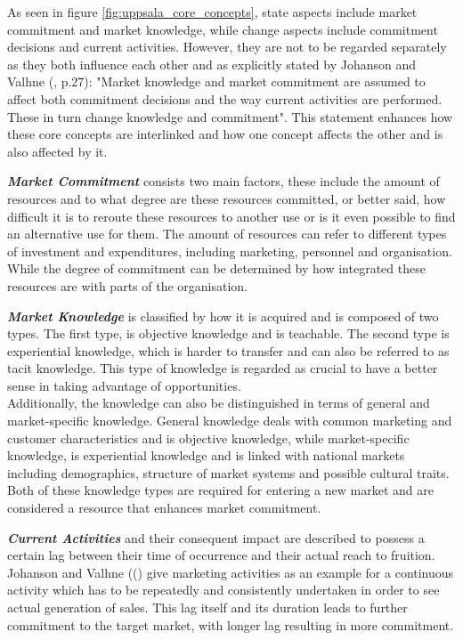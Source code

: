\documentclass[12pt,a4paper]{article}
\begin{document}
 
As seen in figure \ref{fig:uppsala_core_concepts}, state aspects include market commitment and market knowledge, while change aspects include commitment decisions and current activities. However, they are not to be regarded separately as they both influence each other and as explicitly stated by Johanson and Valhne (\citeyear{johansonInternationalizationProcessFirm1977}, p.27): "Market knowledge and market commitment are assumed to affect both commitment decisions and
the way current activities are performed. These in turn change knowledge and commitment". This statement enhances how these core concepts are interlinked and how one concept affects the other and is also affected by it.  \par
\textbf{\textit{Market Commitment}} consists two main factors, these include the amount of resources and to what degree are these resources committed, or better said, how difficult it is to reroute these resources to another use or is it even possible to find an alternative use for them. The amount of resources can refer to different types of investment and expenditures, including marketing, personnel and organisation. While the degree of commitment can be determined by how integrated these resources are with parts of the organisation. \par
\textbf{\textit{Market Knowledge}} is classified by how it is acquired and is composed of two types. The first type, is objective knowledge and is teachable. The second type is experiential knowledge, which is harder to transfer and can also be referred to as tacit knowledge. This type of knowledge is regarded as crucial to have a better sense in taking advantage of opportunities. \\
Additionally, the knowledge can also be distinguished in terms of general and market-specific knowledge. General knowledge deals with common marketing and customer characteristics and is objective knowledge, while market-specific knowledge, is experiential knowledge and is linked with national markets including demographics, structure of market systems and possible cultural traits. Both of these knowledge types are required for entering a new market and are considered a resource that enhances market commitment. \par
\textbf{\textit{Current Activities}} and their consequent impact are described to possess a certain lag between their time of occurrence and their actual reach to fruition. Johanson and Valhne ((\citeyear{johansonInternationalizationProcessFirm1977}) give marketing activities as an example for a continuous activity which has to be repeatedly and consistently undertaken in order to see actual generation of sales. This lag itself and its duration leads to further commitment to the target market, with longer lag resulting in more commitment. \\
\end{document}
